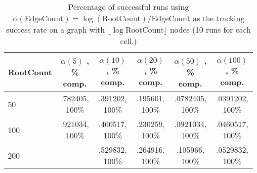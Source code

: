 \begin{table}[h]
\centering
\begin{tabular}{l||c|c|c|c|c|}
RootCount&$\alpha (5)$ , \% comp.&$\alpha (10)$ , \% comp.&$\alpha (20)$ , \% comp.&$\alpha (50)$ , \% comp.&$\alpha (100)$ , \% comp.\\
\hline
50&.782405, 100\%&.391202, 100\%&.195601, 100\%&.0782405, 100\%&.0391202, 100\%\\
100&.921034, 100\%&.460517, 100\%&.230259, 100\%&.0921034, 100\%&.0460517, 100\%\\
200&&.529832, 100\%&.264916, 100\%&.105966, 100\%&.0529832, 100\%\\
\end{tabular}
\caption{Percentage of successful runs using $\alpha (\textrm{EdgeCount}) = \log (\textrm{RootCount})/\textrm{EdgeCount}$ as the tracking success rate on a graph with $\lfloor \log \text{RootCount} \rfloor $ nodes (10 runs for each cell.)}
\end{table}